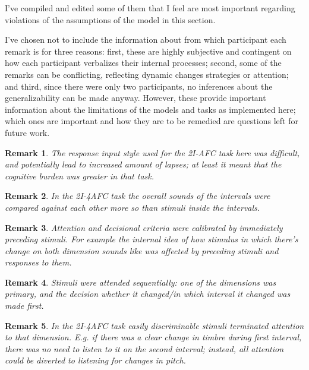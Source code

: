 \documentclass{article}\usepackage{knitr}
\newtheorem{remark}{Remark}
\begin{document}
I've compiled and edited some of them that I feel are most important regarding violations of the assumptions of the model in this section. 

I've chosen not to include the information about from which participant each remark is for three reasons: first, these are highly subjective and contingent on how each participant verbalizes their internal processes; second, some of the remarks can be conflicting, reflecting dynamic changes strategies or attention; and third, since there were only two participants, no inferences about the generalizability can be made anyway. However, these provide important information about the limitations of the models and tasks as implemented here; which ones are important and how they are to be remedied are questions left for future work. 

\begin{remark}
The response input style used for the 2I-AFC task here was difficult, and potentially lead to increased amount of lapses; at least it meant that the cognitive burden was greater in that task.
\end{remark}

\begin{remark}
In the 2I-4AFC task the overall sounds of the intervals were compared against each other more so than stimuli inside the intervals.
\end{remark}

\begin{remark}
Attention and decisional criteria were calibrated by immediately preceding stimuli. For example the internal idea of how stimulus in which there's change on both dimension sounds like was affected by preceding stimuli and responses to them. 
\end{remark}

\begin{remark}
Stimuli were attended sequentially: one of the dimensions was primary, and the decision whether it changed/in which interval it changed was made first. 
\end{remark}

\begin{remark}
In the 2I-4AFC task easily discriminable stimuli terminated attention to that dimension. E.g. if there was a clear change in timbre during first interval, there was no need to listen to it on the second interval; instead, all attention could be diverted to listening for changes in pitch. 
\end{remark}
\end{document}
